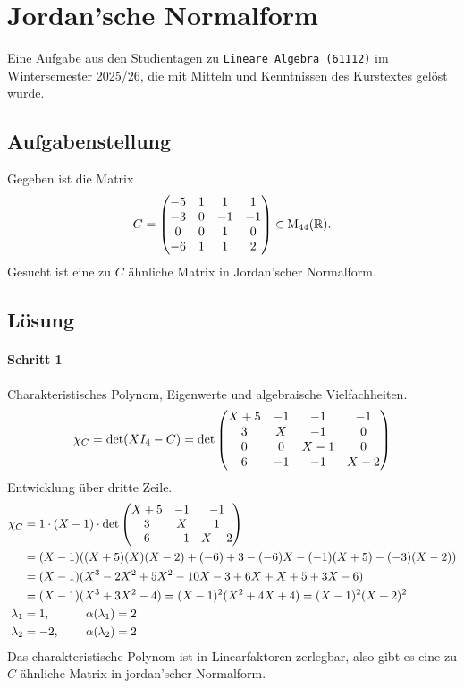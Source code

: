 \documentclass{article}
\begin{document}
\section*{Jordan'sche Normalform}

Eine Aufgabe aus den Studientagen zu \texttt{Lineare Algebra (61112)} im Wintersemester 2025/26, die mit Mitteln und Kenntnissen des Kurstextes gelöst wurde.

\subsection*{Aufgabenstellung}
Gegeben ist die Matrix
\[
C = \begin{pmatrix}-5&1&1&1\\-3&0&-1&-1\\0&0&1&0\\-6&1&1&2\end{pmatrix}\in\mathrm M_{44}(\mathbb{R}).
\]
Gesucht ist eine zu $C$ ähnliche Matrix in Jordan'scher Normalform.

\subsection*{Lösung}
\paragraph{Schritt 1} Charakteristisches Polynom, Eigenwerte und algebraische Vielfachheiten.
\begin{align*}
\chi_C = \det(XI_4 - C) = \det\begin{pmatrix}X+5&-1&-1&-1\\3&X&-1&0\\0&0&X-1&0\\6&-1&-1&X-2\end{pmatrix}
\end{align*}
Entwicklung über dritte Zeile.
\begin{align*}
\chi_C &= 1\cdot(X-1)\cdot\det\begin{pmatrix}X+5&-1&-1\\3&X&1\\6&-1&X-2\end{pmatrix}\\
&= (X-1)((X+5)(X)(X-2) + (-6) + 3 - (-6)X - (-1)(X+5)-(-3)(X-2))\\
&= (X-1)(X^3 -2X^2+5X^2-10X -3+6X+X+5+3X-6)\\
&= (X-1)(X^3+3X^2-4) = (X-1)^2(X^2+4X+4) = (X-1)^2(X+2)^2\\
\lambda_1 &= 1, \qquad \quad \alpha(\lambda_1) = 2\\
\lambda_2 &= -2, \qquad \:\alpha(\lambda_2) = 2
\end{align*}
Das charakteristische Polynom ist in Linearfaktoren zerlegbar, also gibt es eine zu $C$ ähnliche Matrix in jordan'scher Normalform.
\end{document}
